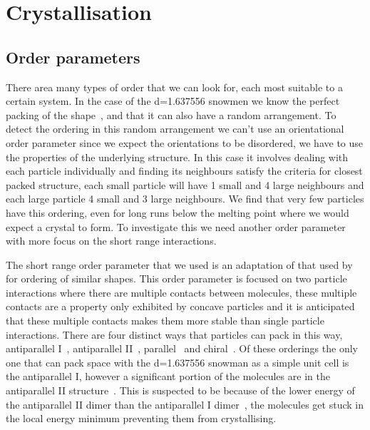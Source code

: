 \chapter{Crystallisation}

\section{Order parameters}

There area many types of order that we can look for, each most suitable to a certain system. In the case of the d=1.637556 snowmen we know the perfect packing of the shape~\figref{}, and that it can also have a random arrangement. To detect the ordering in this random arrangement we can't use an orientational order parameter since we expect the orientations to be disordered, we have to use the properties of the underlying structure. In this case it involves dealing with each particle individually and finding its neighbours satisfy the criteria for closest packed structure, each small particle will have 1 small and 4 large neighbours and each large particle 4 small and 3 large neighbours\tocheck. We find that very few particles have this ordering, even for long runs below the melting point where we would expect a crystal to form. To investigate this we need another order parameter with more focus on the short range interactions.

The short range order parameter that we used is an adaptation of that used by~\textcite{} for ordering of similar shapes. This order parameter is focused on two particle interactions where there are multiple contacts between molecules, these multiple contacts are a property only exhibited by concave particles and it is anticipated that these multiple contacts makes them more stable than single particle interactions. There are four distinct ways that particles can pack in this way, antiparallel I~, antiparallel II~, parallel~ and chiral~. Of these orderings the only one that can pack space with the d=1.637556 snowman as a simple unit cell is the antiparallel I, however a significant portion of the molecules are in the antiparallel II structure~. This is suspected to be because of the lower energy of the antiparallel II dimer than the antiparallel I dimer~, the molecules get stuck in the local energy minimum preventing them from crystallising.

